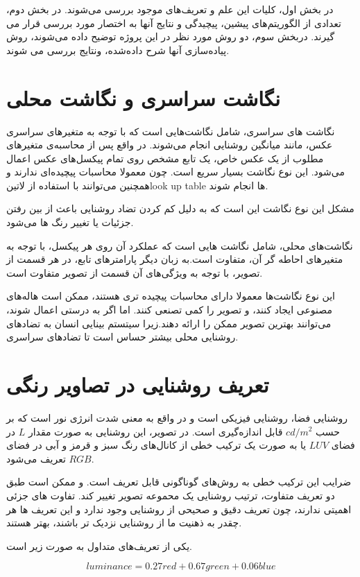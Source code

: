  در بخش اول، کلیات این علم و تعریف‌های موجود بررسی می‌شوند. در بخش دوم، تعدادی از الگوریتم‌های پیشین، پیچیدگی و نتایج آنها به اختصار مورد بررسی قرار می گیرند. دربخش سوم، دو روش  مورد نظر در این پروژه توضیح داده می‌شوند، روش پیاده‌سازی آنها شرح داده‌شده، ونتایج بررسی می شوند.
 
 \section{  نگاشت سراسری و نگاشت محلی}
 
نگاشت های سراسری، شامل نگاشت‌هایی است که با توجه به متغیرهای سراسری عکس، مانند میانگین روشنایی انجام می‌شوند. در واقع پس از محاسبه‌ی متغیرهای مطلوب از یک عکس خاص، یک تابع مشخص روی تمام پیکسل‌های عکس اعمال می‌شود. این نوع نگاشت بسیار سریع است. چون معمولا محاسبات پیچیده‌ای ندارند و همچنین می‌توانند با استفاده از
 ‌لاتین{look up table  }
ها انجام شوند.

مشکل این نوع نگاشت این است که به دلیل کم کردن تضاد روشنایی باعث از بین رفتن جزئیات یا تغییر رنگ ها می‌شود.

نگاشت‌های محلی، شامل نگاشت هایی است که عملکرد آن روی هر پیکسل، با توجه به متغیرهای احاطه گر آن، متفاوت است.به زبان دیگر پارامترهای تابع، در هر قسمت از تصویر، با توجه به ویژگی‌های آن قسمت از تصویر متفاوت است.

این نوع نگاشت‌ها معمولا دارای محاسبات پیچیده تری هستند، ممکن است هاله‌های مصنوعی ایجاد کنند، و تصویر را کمی تصنعی کنند. اما اگر به درستی اعمال شوند، می‌توانند بهترین تصویر ممکن را ارائه دهند.زیرا سیتستم بینایی انسان به تضادهای روشنایی محلی بیشتر حساس است تا تضادهای سراسری.


\section{تعریف روشنایی در تصاویر رنگی}

روشنایی فضا، روشنایی فیزیکی است و در واقع به معنی شدت انرژی نور است که بر حسب $cd/m^{2}$ قابل اندازه‌گیری است. در تصویر، این روشنایی به صورت مقدار $L$ در فضای  $LUV$ یا به صورت یک ترکیب خطی از کانال‌های رنگ سبز و قرمز و آبی در فضای $RGB$ تعریف می‌شود.

ضرایب این ترکیب خطی به روش‌های گوناگونی قابل تعریف است.  و ممکن است طبق دو تعریف متفاوت، ترتیب روشنایی یک محموعه  تصویر تغییر کند. تفاوت های جزئی  اهمیتی ندارند، چون تعریف دقیق و صحیحی از روشنایی وجود ندارد و این تعریف ها هر چقدر به ذهنیت ما از روشنایی نزدیک تر باشند، بهتر  هستند.

یکی از تعریف‌های متداول به صورت زیر است.

\begin{equation}
luminance = 0.27 red + 0.67 green + 0.06 blue
\end{equation}